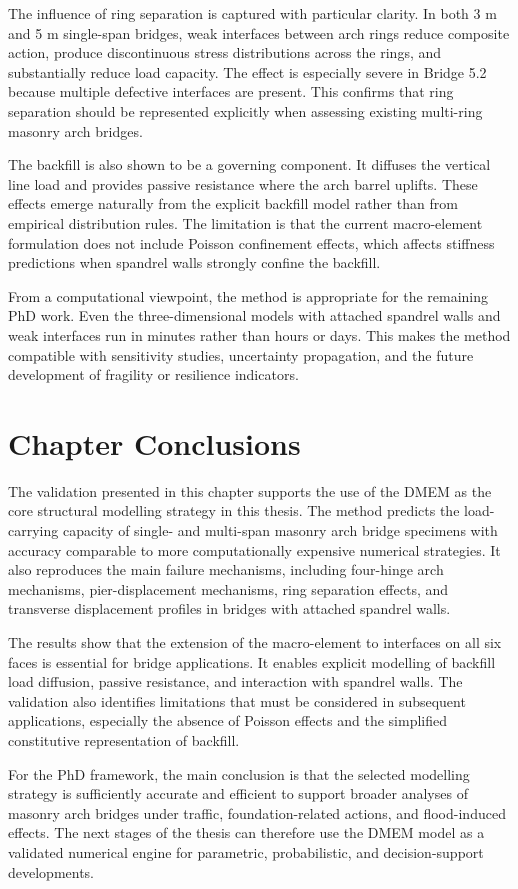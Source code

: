 The influence of ring separation is captured with particular clarity. In both 3 m and 5 m single-span bridges, weak interfaces between arch rings reduce composite action, produce discontinuous stress distributions across the rings, and substantially reduce load capacity. The effect is especially severe in Bridge 5.2 because multiple defective interfaces are present. This confirms that ring separation should be represented explicitly when assessing existing multi-ring masonry arch bridges.

The backfill is also shown to be a governing component. It diffuses the vertical line load and provides passive resistance where the arch barrel uplifts. These effects emerge naturally from the explicit backfill model rather than from empirical distribution rules. The limitation is that the current macro-element formulation does not include Poisson confinement effects, which affects stiffness predictions when spandrel walls strongly confine the backfill.

From a computational viewpoint, the method is appropriate for the remaining PhD work. Even the three-dimensional models with attached spandrel walls and weak interfaces run in minutes rather than hours or days. This makes the method compatible with sensitivity studies, uncertainty propagation, and the future development of fragility or resilience indicators.

\section{Chapter Conclusions}
\label{sec:dmem-validation-conclusions}

The validation presented in this chapter supports the use of the \gls{DMEM} as the core structural modelling strategy in this thesis. The method predicts the load-carrying capacity of single- and multi-span masonry arch bridge specimens with accuracy comparable to more computationally expensive numerical strategies. It also reproduces the main failure mechanisms, including four-hinge arch mechanisms, pier-displacement mechanisms, ring separation effects, and transverse displacement profiles in bridges with attached spandrel walls.

The results show that the extension of the macro-element to interfaces on all six faces is essential for bridge applications. It enables explicit modelling of backfill load diffusion, passive resistance, and interaction with spandrel walls. The validation also identifies limitations that must be considered in subsequent applications, especially the absence of Poisson effects and the simplified constitutive representation of backfill.

For the PhD framework, the main conclusion is that the selected modelling strategy is sufficiently accurate and efficient to support broader analyses of masonry arch bridges under traffic, foundation-related actions, and flood-induced effects. The next stages of the thesis can therefore use the \gls{DMEM} model as a validated numerical engine for parametric, probabilistic, and decision-support developments.
